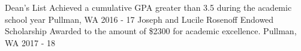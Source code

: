 \begin{cvhonors}
  \cvhonor
    {Dean's List}
    {Achieved a cumulative GPA greater than 3.5 during the academic school year}
    {Pullman, WA}
    {2016 - 17}
  \cvhonor
    {Joseph and Lucile Rosenoff Endowed Scholarship}
    {Awarded to the amount of \$2300 for academic excellence.}
    {Pullman, WA}
    {2017 - 18}
\end{cvhonors}